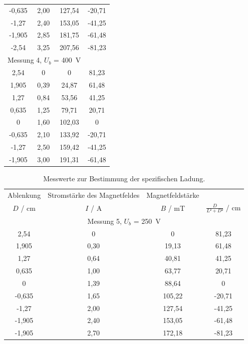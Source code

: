 \begin{table}
\begin{tabular}{c c c c}
    -0,635 & 2,00 & 127,54 & -20,71 \\
    -1,27 & 2,40 & 153,05 & -41,25 \\
    -1,905 & 2,85 & 181,75 & -61,48  \\
    -2,54 & 3,25  & 207,56 & -81,23\\
    \midrule
    \multicolumn {3}{c}{Messung 4, $U_b$ = \SI{400}{\volt}} \\
    \midrule
    2,54 & 0  & 0  & 81,23 \\
    1,905 & 0,39  & 24,87 & 61,48 \\
    1,27 & 0,84  & 53,56 & 41,25 \\
    0,635 & 1,25  & 79,71 & 20,71 \\
    0      & 1,60 &  102,03 & 0 \\
    -0,635 & 2,10 &  133,92 & -20,71  \\
    -1,27 & 2,50 & 159,42 & -41,25 \\
    -1,905 & 3,00 &  191,31 & -61,48 \\
    \bottomrule
  \end{tabular}
\end{table}

\begin{table}
  \centering
  \caption{Messwerte zur Bestimmung der spezifischen Ladung.}
  \label{tab:5}
  \begin{tabular}{c c c c}
    Ablenkung & Stromstärke des Magnetfeldes & Magnetfeldstärke &  \\
    $D$ / \si{\centi\meter} & $I$ / \si{\ampere} & $B$ / \si{\milli\tesla} & $\frac{D}{L²+D²}$ / \si{\centi\meter} \\
    \midrule
    \multicolumn {4}{c}{Messung 5, $U_b$ = \SI{250}{\volt}} \\
    \midrule
    2,54 & 0 & 0 & 81,23 \\
    1,905 & 0,30 & 19,13 & 61,48 \\
    1,27 & 0,64 & 40,81 & 41,25  \\
    0,635 & 1,00 & 63,77 & 20,71 \\
    0      & 1,39 & 88,64 & 0 \\
    -0,635 & 1,65 & 105,22 & -20,71\\
    -1,27 & 2,00 & 127,54 & -41,25 \\
    -1,905 & 2,40& 153,05 & -61,48 \\
    -1,905 & 2,70 & 172,18 & -81,23 \\
    \bottomrule
  \end{tabular}
\end{table}

